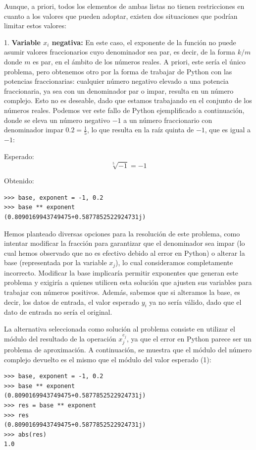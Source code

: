 \documentclass[conference,a4paper]{IEEEtran}
\begin{document}
Aunque, a priori, todos los elementos de ambas listas no tienen restricciones en cuanto a los valores que pueden adoptar, existen dos situaciones que podrían limitar estos valores:


1. \textbf{Variable \( x_i \) negativa:} En este caso, el exponente de la función no puede asumir valores fraccionarios cuyo denominador sea par, es decir, de la forma \( k/m \) donde \( m \) es par, en el ámbito de los números reales. A priori, este sería el único problema, pero obtenemos otro por la forma de trabajar de Python con las potencias fraccionarias: cualquier número negativo elevado a una potencia fraccionaria, ya sea con un denominador par o impar, resulta en un número complejo. Esto no es deseable, dado que estamos trabajando en el conjunto de los números reales. Podemos ver este fallo de Python ejemplificado a continuación, donde se eleva un número negativo \( -1 \) a un número fraccionario con denominador impar \( 0.2 = \frac{1}{5} \), lo que resulta en la raíz quinta de \(-1\), que es igual a \(-1\):

Esperado:
\[
\sqrt[5]{-1} = -1
\]

Obtenido:
\begin{verbatim}
>>> base, exponent = -1, 0.2
>>> base ** exponent
(0.8090169943749475+0.5877852522924731j)
\end{verbatim}

Hemos planteado diversas opciones para la resolución de este problema, como intentar modificar la fracción para garantizar que el denominador sea impar (lo cual hemos observado que no es efectivo debido al error en Python) o alterar la base (representada por la variable \(x_j\)), lo cual consideramos completamente incorrecto. Modificar la base implicaría permitir exponentes que generan este problema y exigiría a quienes utilicen esta solución que ajusten sus variables para trabajar con números positivos. Además, sabemos que si alteramos la base, es decir, los datos de entrada, el valor esperado \(y_i\) ya no sería válido, dado que el dato de entrada no sería el original. 


La alternativa seleccionada como solución al problema consiste en utilizar el módulo del resultado de la operación \(x_j^{e_j}\), ya que el error en Python parece ser un problema de aproximación. A continuación, se muestra que el módulo del número complejo devuelto es el mismo que el módulo del valor esperado (1):

\begin{verbatim}
>>> base, exponent = -1, 0.2
>>> base ** exponent
(0.8090169943749475+0.5877852522924731j)
>>> res = base ** exponent
>>> res
(0.8090169943749475+0.5877852522924731j)
>>> abs(res)
1.0
\end{verbatim}
\end{document}
